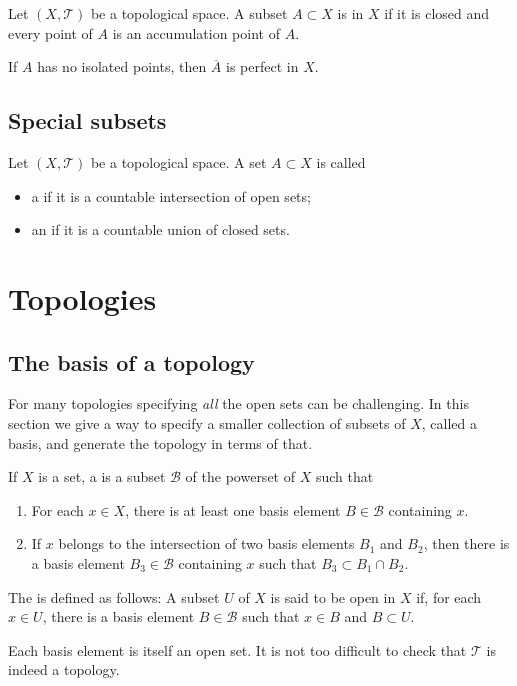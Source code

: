\begin{definition}
Let $(X,\mathcal{T})$ be a topological space. A subset $A\subset X$ is  in $X$ if it is closed and every point of $A$ is an accumulation point of $A$.
\end{definition}
\begin{lemma}
If $A$ has no isolated points, then $\overline{A}$ is perfect in $X$.
\end{lemma}

\subsection{Special subsets}
\begin{definition}
Let $(X,\mathcal{T})$ be a topological space. A set $A\subset X$ is called
\begin{itemize}
\item a  if it is a countable intersection of open sets;
\item an  if it is a countable union of closed sets.
\end{itemize}
\end{definition}

\section{Topologies}
\subsection{The basis of a topology}
For many topologies specifying \textit{all} the open sets can be challenging. In this section we give a way to specify a smaller collection of subsets of $X$, called a basis, and generate the topology in terms of that.

\begin{definition}
If $X$ is a set, a  is a subset $\mathcal{B}$ of the powerset of $X$ such that
\begin{enumerate}
\item For each $x\in X$, there is at least one basis element $B\in\mathcal{B}$ containing $x$.
\item If $x$ belongs to the intersection of two basis elements $B_1$ and $B_2$, then there is a basis element $B_3\in\mathcal{B}$ containing $x$ such that $B_3\subset B_1 \cap B_2$.
\end{enumerate}
The  is defined as follows: A subset $U$ of $X$ is said to be open in $X$ if, for each $x\in U$, there is a basis element $B\in\mathcal{B}$ such that $x\in B$ and $B\subset U$. 
\end{definition}
Each basis element is itself an open set. It is not too difficult to check that $\mathcal{T}$ is indeed a topology.

